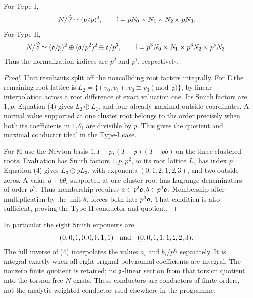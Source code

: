 \begin{theorem}
For Type I,
\[
 N/\widehat S\simeq(\mathfrak o/p)^2,
 \qquad\mathfrak f=pN_0\times N_1\times N_2\times pN_3.
\]
For Type II,
\[
 N/\widehat S\simeq(\mathfrak o/p)^2\oplus(\mathfrak o/p^2)^2\oplus\mathfrak o/p^3,
 \qquad\mathfrak f=p^3N_0\times N_1\times p^3N_2\times p^3N_3.
\]
Thus the normalization indices are $p^2$ and $p^9$, respectively.
\end{theorem}
\begin{proof}
Unit resultants split off the noncolliding root factors integrally. For E the
remaining root lattice is
$L_2=\{(v_0,v_3):v_0\equiv v_3\pmod p\}$, by linear interpolation across a
root difference of exact valuation one. Its Smith factors are $1,p$.
Equation (4) gives $L_2\oplus L_2$, and four already maximal outside coordinates.
A normal value supported at one cluster root belongs to the order precisely
when both its coefficients in $1,\theta_i$ are divisible by $p$. This gives the
quotient and maximal conductor ideal in the Type-I case.

For M use the Newton basis $1,T-p,(T-p)(T-pb)$ on the three clustered roots.
Evaluation has Smith factors $1,p,p^2$, so its root lattice $L_3$ has index
$p^3$. Equation (4) gives $L_3\oplus pL_3$, with exponents $(0,1,2,1,2,3)$,
and two outside zeros. A value $a+b\theta_i$ supported at one cluster root has
Lagrange denominators of order $p^2$. Thus membership requires
$a\in p^2\mathfrak o,b\in p^3\mathfrak o$. Membership after multiplication by the unit
$\theta_i$ forces both into $p^3\mathfrak o$. That condition is also sufficient, proving
the Type-II conductor and quotient.
\end{proof}

In particular the eight Smith exponents are
\[
 (0,0,0,0,0,0,1,1)\quad\hbox{and}\quad(0,0,0,1,1,2,2,3).
\]
The full inverse of (4) interpolates the values $a_i$ and $b_i/p^{k_i}$
separately. It is integral exactly when all eight original polynomial
coefficients are integral. The nonzero finite quotient is retained; no
$\mathfrak o$-linear section from that torsion quotient into the torsion-free $N$ exists.
These conductors are conductors of finite orders, not the analytic weighted
conductor used elsewhere in the programme.

